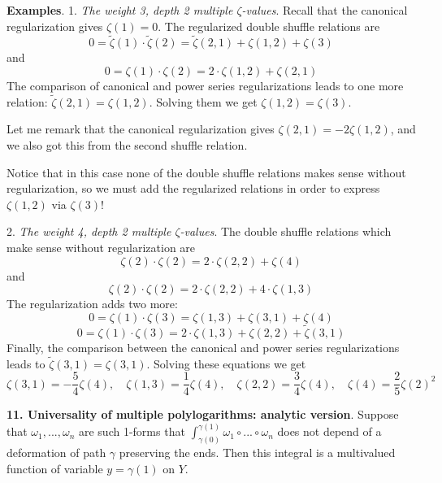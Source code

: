 \documentclass[10pt]{article}
\begin{document}
{\bf Examples}. 1. {\it The weight 3, depth 2 multiple $\zeta$-values}. 
Recall that the canonical regularization gives $\zeta(1) =0$. 
The regularized  double shuffle relations are
$$
0 = \widetilde \zeta(1) \cdot \widetilde \zeta(2) = \widetilde \zeta(2,1) + \zeta(1,2) + \zeta(3)
$$
and 
$$
0 = \zeta(1) \cdot \zeta(2) = 2 \cdot \zeta(1,2) + \zeta(2,1)
$$
The comparison of canonical and power series regularizations leads to one more relation:
$
\widetilde \zeta(2,1) = \zeta(1,2)
$.  Solving them we get $\zeta(1,2) = \zeta(3)$.

Let me remark that the canonical regularization gives   
$\zeta(2,1)
= -2 \zeta(1,2)$, and we also got this from  the second shuffle relation. 

Notice that in this case none of the 
double shuffle relations makes sense without regularization, 
so we must add the
regularized  relations in order to express
$\zeta(1,2)$ via $\zeta(3)$!


2. {\it The weight 4, depth 2 multiple $\zeta$-values}.  
The  double shuffle relations which make sense without regularization  are
$$%
\zeta(2) \cdot \zeta(2) = 2 \cdot \zeta(2,2) +  \zeta(4)
$$%
and
$$%
\zeta(2) \cdot \zeta(2) = 2 \cdot \zeta(2,2) + 4 \cdot \zeta(1,3)
$$%
The regularization adds two  more:
$$%
0 = \zeta(1) \cdot \zeta(3) =  \zeta(1,3) +  \zeta(3,1) + \zeta(4)
$$%
$$%
0 = \zeta(1) \cdot \zeta(3) = 2 \cdot \zeta(1,3) + \zeta(2,2) + \widetilde \zeta(3,1)
$$%
Finally, the comparison between the canonical and power series regularizations leads to 
$
\widetilde \zeta(3,1) = \zeta(3,1) 
$. 
Solving these equations we get 
$$
\zeta(3,1) = -\frac{5}{4}\zeta(4),\quad \zeta(1,3) = \frac{1}{4}\zeta(4),\quad \zeta(2,2) = \frac{3}{4}\zeta(4),\quad
\zeta(4) = \frac{2}{5}\zeta(2)^2
$$
 

{\bf 11. Universality of multiple polylogarithms: analytic version}. Suppose that $\omega_{1}, ... , \omega_{n}$
   are such 1-forms that $\int_{\gamma(0)}^{\gamma(1)}\omega_{1}
\circ ... \circ \omega_{n}$ does not depend of a deformation of path $\gamma$ preserving the ends. Then this integral is a multivalued function of variable $y = \gamma(1)$ on $Y$.
\end{document}
